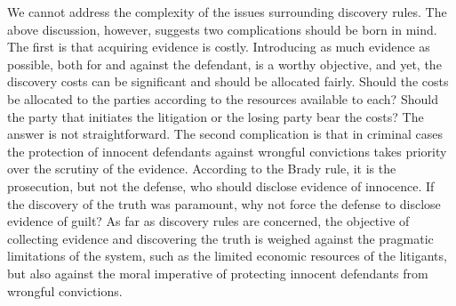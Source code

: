 \documentclass[10pt]{article}
\begin{document}

We cannot address the complexity of the issues surrounding discovery rules. The above discussion, however, suggests 
two complications should be born in mind. The first is that acquiring evidence is costly. Introducing as much evidence as possible, both for and against the defendant, is a worthy objective, and yet, the discovery costs can be significant and should be allocated fairly. Should the costs be allocated to the parties according to the resources available to each? Should the party that initiates the litigation or the losing party bear the costs? The answer is not straightforward.  The second complication is that in criminal cases the protection of innocent defendants against wrongful convictions takes priority over the scrutiny of the evidence. According to the Brady rule, it is the prosecution, but not the defense, who should disclose evidence of innocence. If the discovery of the truth was paramount, why not force the defense to disclose evidence of guilt? As far as discovery rules are concerned, the objective of collecting evidence and discovering the truth is weighed against the pragmatic limitations of the system, such as the limited economic resources of the litigants, but also against the moral imperative of protecting innocent defendants from wrongful convictions.







\end{document}
